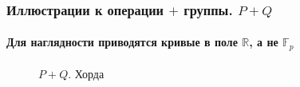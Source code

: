 \begin{frame}
    \frametitle{Иллюстрации к операции $+$ группы. $P+Q$}
    \framesubtitle{Для наглядности приводятся кривые в поле $\mathbb{R}$, а не $\mathbb{F}_p$}

    \begin{figure}
        \begin{center}
            \caption{$P+Q$. Хорда}\label{pict:ellipticAdd}
        \end{center}
    \end{figure} 
\end{frame}


